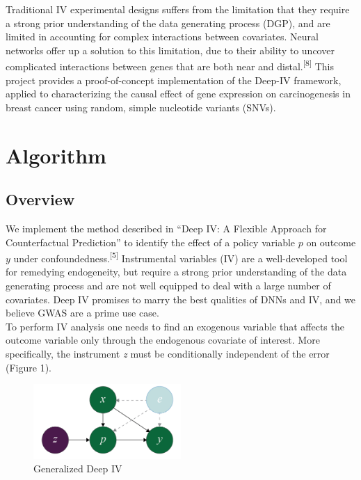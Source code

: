 \documentclass[11pt, oneside, twocolumn]{article}   	%
\begin{document}
Traditional IV experimental designs suffers from the limitation that they require a strong prior understanding of the data generating process (DGP), and are limited in accounting for complex interactions between covariates. Neural networks offer up a solution to this limitation, due to their ability to uncover complicated interactions between genes that are both near and distal.\textsuperscript{[8]} This project provides a proof-of-concept implementation of the Deep-IV framework, applied to characterizing the causal effect of gene expression on carcinogenesis in breast cancer using random, simple nucleotide variants (SNVs). 



\section{Algorithm}
\subsection{Overview}
We implement the method described in ``Deep IV: A Flexible Approach for Counterfactual Prediction'' to identify the effect of a policy variable $p$ on outcome $y$ under confoundedness.\textsuperscript{[5]} Instrumental variables (IV) are a well-developed tool for remedying endogeneity, but require a strong prior understanding of the data generating process and are not well equipped to deal with a large number of covariates. Deep IV promises to marry the best qualities of DNNs and IV, and we believe GWAS are a prime use case. \\

To perform IV analysis one needs to find an exogenous variable that affects the outcome variable only through the endogenous covariate of interest. More specifically, the instrument \emph{z} must be conditionally independent of the error (Figure 1).\\

\begin{figure}[h]
	\caption{Generalized Deep IV}
	\centering
	\includegraphics[width=0.5\textwidth]{Figure_1.png}
\end{figure}
\end{document}
